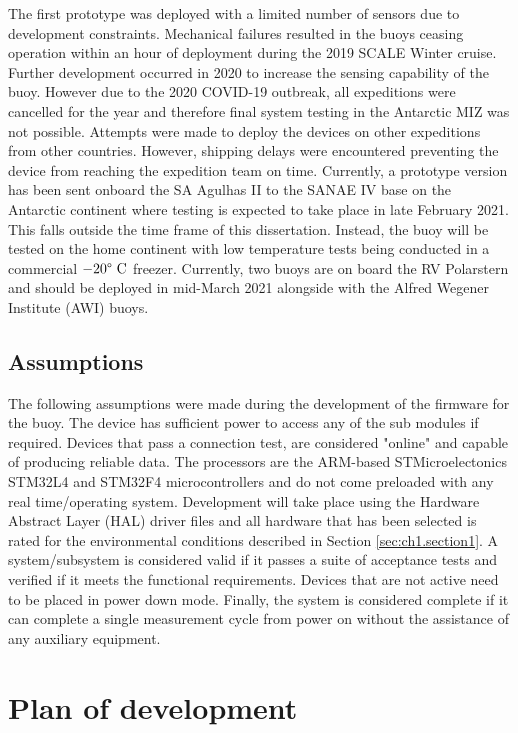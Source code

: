 The first prototype was deployed with a limited number of sensors due to development constraints. Mechanical failures resulted in the buoys ceasing operation within an hour of deployment during the 2019 SCALE Winter cruise. Further development occurred in 2020 to increase the sensing capability of the buoy. However due to the 2020 COVID-19 outbreak, all expeditions were cancelled for the year and therefore final system testing in the Antarctic MIZ was not possible. Attempts were made to deploy the devices on other expeditions from other countries. However, shipping delays were encountered preventing the device from reaching the expedition team on time. Currently, a prototype version has been sent onboard the SA Agulhas II to the SANAE IV base on the Antarctic continent where testing is expected to take place in late February 2021. This falls outside the time frame of this dissertation. Instead, the buoy will be tested on the home  continent with low temperature tests being conducted in a commercial $-20\degree \text{ C}$ freezer. Currently, two buoys are on board the RV Polarstern and should be deployed in mid-March 2021 alongside with the Alfred Wegener Institute (AWI) buoys.

\subsection{Assumptions}

The following assumptions were made during the development of the firmware for the buoy. The device has sufficient power to access any of the sub modules if required. Devices that pass a connection test, are considered "online" and capable of producing reliable data. The processors are the ARM-based STMicroelectonics  STM32L4 and STM32F4 microcontrollers and do not come preloaded with any real time/operating system. Development will take place using the Hardware Abstract Layer (HAL) driver files and all hardware that has been selected is rated for the environmental conditions described in Section \ref{sec:ch1.section1}. A system/subsystem is considered valid if it passes a suite of acceptance tests and verified if it meets the functional requirements. Devices that are not active need to be placed in power down mode. Finally, the system is considered complete if it can complete a single measurement cycle from power on without the assistance of any auxiliary equipment.

\section{Plan of development}
\label{sec:ch1.section3}

